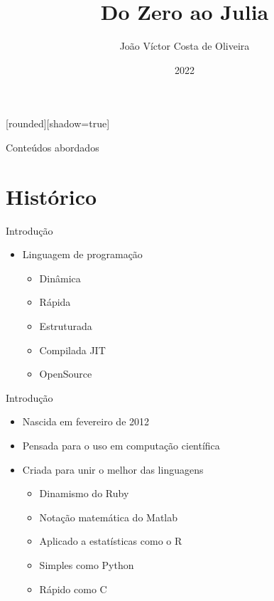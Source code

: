 \documentclass{beamer}
\title{Do Zero ao Julia}
\author{João Víctor Costa de Oliveira}
\institute[] 
{
    \textit{}\\

	\medskip
	\textit{}\\
    \medskip
}
\date{2022}
\begin{document}
[rounded][shadow=true]


\begin{frame}
\titlepage
\begin{figure}[H]

\end{figure}
\end{frame}

\begin{frame}{Conteúdos abordados}
    \tableofcontents
\end{frame}

\section{Histórico}
\begin{frame}{Introdução}
    \begin{itemize}
        \item Linguagem de programação
        \begin{itemize}
            \item Dinâmica
            \item Rápida
            \item Estruturada
            \item Compilada JIT
            \item OpenSource
        \end{itemize}
    \end{itemize}
\end{frame}

\begin{frame}{Introdução}
    \begin{itemize}
        \item Nascida em fevereiro de 2012
        \item Pensada para o uso em computação científica
        \item Criada para unir o melhor das linguagens
        \begin{itemize}
            \item Dinamismo do Ruby
            \item Notação matemática do Matlab
            \item Aplicado a estatísticas como o R 
            \item Simples como Python
            \item Rápido como C
        \end{itemize}
    \end{itemize}
\end{frame}
\end{document}
